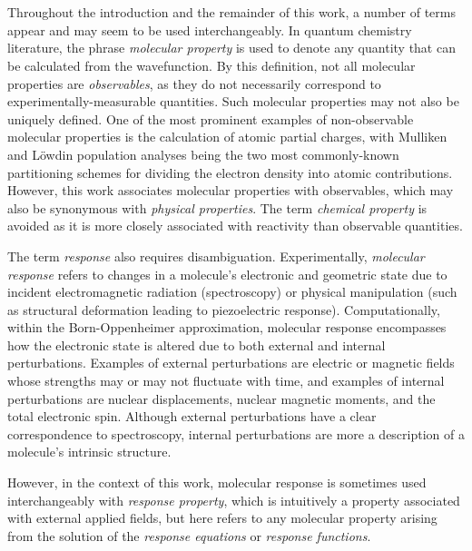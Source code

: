 \documentclass[%
class = book,%
crop = false,%
float = true,%
multi = true,%
preview = false,%
]{standalone}
\begin{document}
\section{\texorpdfstring{}{Terms and Fundamental Definitions}}
\label{sec:terms-and-fundamental-definitions}

Throughout the introduction and the remainder of this work, a number of terms appear and may seem to be used interchangeably. In quantum chemistry literature, the phrase \emph{molecular property} is used to denote any quantity that can be calculated from the wavefunction. By this definition, not all molecular properties are \emph{observables}, as they do not necessarily correspond to experimentally-measurable quantities. Such molecular properties may not also be uniquely defined. One of the most prominent examples of non-observable molecular properties is the calculation of atomic partial charges, with Mulliken\cite{Mulliken1955,szabo1989modern} and L{\"{o}}wdin\cite{Lowdin1950} population analyses being the two most commonly-known partitioning schemes for dividing the electron density into atomic contributions. However, this work associates molecular properties with observables, which may also be synonymous with \emph{physical properties}. The term \emph{chemical property} is avoided as it is more closely associated with reactivity than observable quantities.

The term \emph{response} also requires disambiguation. Experimentally, \emph{molecular response} refers to changes in a molecule's electronic and geometric state due to incident electromagnetic radiation (spectroscopy) or physical manipulation (such as structural deformation leading to piezoelectric response)\cite{doi:10.1021/jz400355v,doi:10.1021/jp412740j,doi:10.1021/acs.jpcb.7b10085}. Computationally, within the Born-Oppenheimer approximation, molecular response encompasses how the electronic state is altered due to both external and internal perturbations. Examples of external perturbations are electric or magnetic fields whose strengths may or may not fluctuate with time, and examples of internal perturbations are nuclear displacements, nuclear magnetic moments, and the total electronic spin. Although external perturbations have a clear correspondence to spectroscopy, internal perturbations are more a description of a molecule's intrinsic structure.

However, in the context of this work, molecular response is sometimes used interchangeably with \emph{response property}, which is intuitively a property associated with external applied fields, but here refers to any molecular property arising from the solution of the \emph{response equations} or \emph{response functions}.
\end{document}
